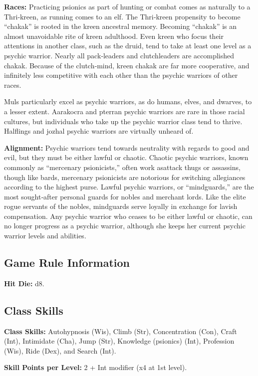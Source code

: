 \textbf{Races:} Practicing psionics as part of hunting or combat comes as naturally to a Thri‐kreen, as running comes to an elf. The Thri‐kreen propensity to become “chakak” is rooted in the kreen ancestral memory. Becoming “chakak” is an almost unavoidable rite of kreen adulthood. Even kreen who focus their attentions in another class, such as the druid, tend to take at least one level as a psychic warrior. Nearly all pack‐leaders and clutchleaders are accomplished chakak. Because of the clutch‐mind, kreen chakak are far more cooperative, and infinitely less competitive with each other than the psychic warriors of other races.

Muls particularly excel as psychic warriors, as do humans, elves, and dwarves, to a lesser extent. Aarakocra and pterran psychic warriors are rare in those racial cultures, but individuals who take up the psychic warrior class tend to thrive. Halflings and jozhal psychic warriors are virtually unheard of.

\textbf{Alignment:} Psychic warriors tend towards neutrality with regards to good and evil, but they must be either lawful or chaotic. Chaotic psychic warriors, known commonly as “mercenary psionicists,” often work asattack thugs or assassins, though like bards, mercenary psionicists are notorious for switching allegiances according to the highest purse. Lawful psychic warriors, or “mindguards,” are the most sought‐after personal guards for nobles and merchant lords. Like the elite rogue servants of the nobles, mindguards serve loyally in exchange for lavish compensation. Any psychic warrior who ceases to be either lawful or chaotic, can no longer progress as a psychic warrior, although she keeps her current psychic warrior levels and abilities.

\subsection{Game Rule Information}

\textbf{Hit Die:} d8.

\subsection{Class Skills}

\textbf{Class Skills:} Autohypnosis (Wis), Climb (Str), Concentration (Con), Craft (Int), Intimidate (Cha), Jump (Str), Knowledge (psionics) (Int), Profession (Wis), Ride (Dex), and Search (Int).

\textbf{Skill Points per Level:} 2 + Int modifier (x4 at 1st level).

